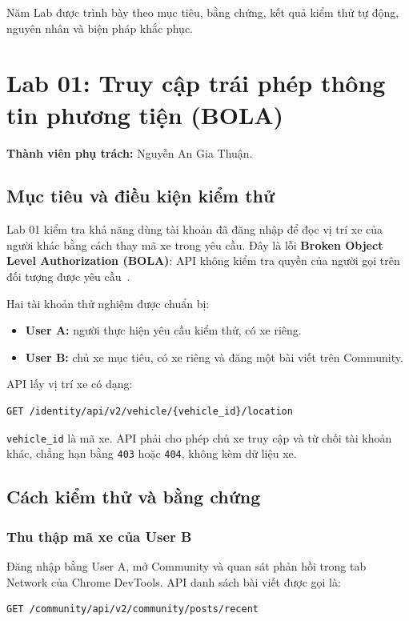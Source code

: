 \documentclass[oneside,a4paper,12pt]{extreport}
\begin{document}
Năm Lab được trình bày theo mục tiêu, bằng chứng, kết quả kiểm thử
tự động, nguyên nhân và biện pháp khắc phục.

\section{Lab 01: Truy cập trái phép thông tin phương tiện (BOLA)}
\label{chap:lab01}

\noindent\textbf{Thành viên phụ trách:} Nguyễn An Gia Thuận.

\subsection{Mục tiêu và điều kiện kiểm thử}

Lab 01 kiểm tra khả năng dùng tài khoản đã đăng nhập để đọc vị trí
xe của người khác bằng cách thay mã xe trong yêu cầu. Đây là lỗi
\textbf{Broken Object Level Authorization (BOLA)}: API không kiểm tra
quyền của người gọi trên đối tượng được yêu cầu~\cite{owasp-bola}.

Hai tài khoản thử nghiệm được chuẩn bị:
\begin{itemize}
    \item \textbf{User A:} người thực hiện yêu cầu kiểm thử, có xe riêng.
    \item \textbf{User B:} chủ xe mục tiêu, có xe riêng và đăng một bài
    viết trên Community.
\end{itemize}

API lấy vị trí xe có dạng:
\begin{Verbatim}[breaklines=true,breakanywhere=true,fontsize=\small]
GET /identity/api/v2/vehicle/{vehicle_id}/location
\end{Verbatim}

\texttt{vehicle\_id} là mã xe. API phải cho phép chủ xe truy cập và
từ chối tài khoản khác, chẳng hạn bằng \texttt{403} hoặc \texttt{404},
không kèm dữ liệu xe.

\subsection{Cách kiểm thử và bằng chứng}

\subsubsection{Thu thập mã xe của User B}

Đăng nhập bằng User A, mở Community và quan sát phản hồi trong tab
Network của Chrome DevTools. API danh sách bài viết được gọi là:
\begin{Verbatim}[breaklines=true,breakanywhere=true,fontsize=\small]
GET /community/api/v2/community/posts/recent
\end{Verbatim}
\end{document}
